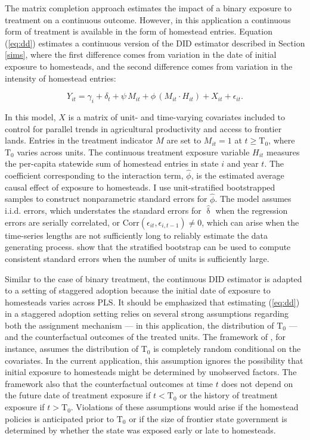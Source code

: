 The matrix completion approach estimates the impact of a binary exposure to treatment on a continuous outcome. However, in this application a continuous form of treatment is available in the form of homestead entries. Equation (\ref{eq:dd}) estimates a continuous version of the DID estimator described in Section \ref{sims}, where the first difference comes from variation in the date of initial exposure to homesteads, and the second difference comes from variation in the intensity of homestead entries:

\begin{equation} 
Y_{it} =  \gamma_i + \delta_t + \psi \, M_{it} + \phi \, (M_{it} \cdot H_{it}) + X_{it}  + \epsilon_{it}. \label{eq:dd} 
\end{equation}

In this model, $X$ is a matrix of unit- and time-varying covariates included to control for parallel trends in agricultural productivity and access to frontier lands. Entries in the treatment indicator $M$ are set to $M_{it} = 1$ at $t \geq  \text{T}_0$, where $\text{T}_0$ varies across units. The continuous treatment exposure variable $H_{it}$ measures the per-capita statewide sum of homestead entries in state $i$ and year $t$. The coefficient corresponding to the interaction term, $\hat{\phi}$, is the estimated average causal effect of exposure to homesteads. I use unit-stratified bootstrapped samples to construct nonparametric standard errors for $\hat{\phi}$. The model assumes i.i.d. errors, which understates the standard errors for $\hat{\updelta}$ when the regression errors are serially correlated, or $\mathrm{Corr} (\epsilon_{it}, \epsilon_{i,t-1}) \neq 0$, which can arise when the time-series lengths are not sufficiently long to reliably estimate the data generating process. \citet{bertrand2004much} show that the stratified bootstrap can be used to compute consistent standard errors when the number of units is sufficiently large. 

Similar to the case of binary treatment, the continuous DID estimator is adapted to a setting of staggered adoption because the initial date of exposure to homesteads varies across PLS. It should be emphasized that estimating (\ref{eq:dd}) in a staggered adoption setting relies on several strong assumptions regarding both the assignment mechanism --- in this application, the distribution of $\text{T}_0$ --- and the counterfactual outcomes of the treated units. The framework of \citet{athey2018design}, for instance, assumes the distribution of $\text{T}_0$ is completely random conditional on the covariates. In the current application, this assumption ignores the possibility that initial exposure to homesteads might be determined by unobserved factors. The framework also that the counterfactual outcomes at time $t$ does not depend on the future date of treatment exposure if $t <  \text{T}_0$ or the history of treatment exposure if $t >  \text{T}_0$. Violations of these assumptions would arise if the homestead policies is anticipated prior to $\text{T}_0$ or if the size of frontier state government is determined by whether the state was exposed early or late to homesteads. 

